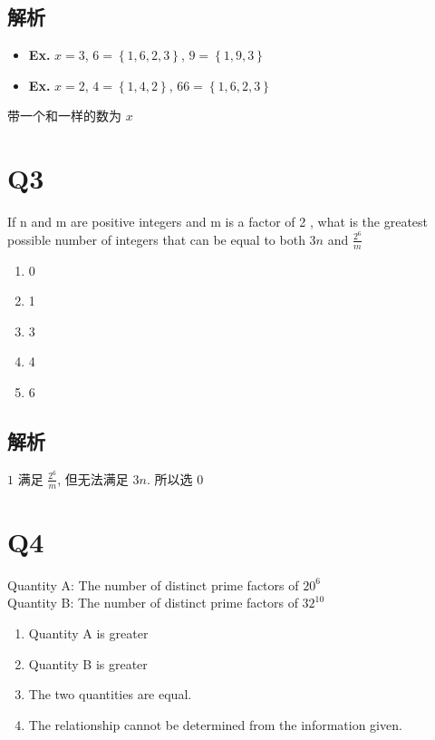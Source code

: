   \subsection{解析}

    \begin{itemize}
      \item \textbf{Ex.} $ x = 3 $, $ 6 = \left\{ 1, 6, 2, 3 \right\} $,
      $ 9 = \left\{ 1, 9, 3 \right\} $
      \item \textbf{Ex.} $ x = 2 $, $ 4 = \left\{ 1, 4, 2 \right\} $,
      $ 6 6 = \left\{ 1, 6, 2, 3 \right\} $
    \end{itemize}

    带一个和一样的数为 $ x $

\section{Q3}

  If n and m are positive integers and m is a factor of 2 , what is the
  greatest possible number of integers that can be equal to both
  $ 3n $ and $ \frac{2^{6}}{m} $

  \begin{enumerate}
    \item 0
    \item 1
    \item 3
    \item 4
    \item 6
  \end{enumerate}

  \subsection{解析}

    $ 1 $ 满足 $ \frac{2^{6}}{m} $, 但无法满足 $ 3n $. 所以选 $ 0 $

\section{Q4}

  \begin{center}
    Quantity A: The number of distinct prime factors of $ 20^{6} $ \\
    Quantity B: The number of distinct prime factors of $ 32^{10} $
  \end{center}

  \begin{enumerate}
    \item Quantity A is greater
    \item Quantity B is greater
    \item The two quantities are equal.
    \item The relationship cannot be determined from the information given.
  \end{enumerate}

